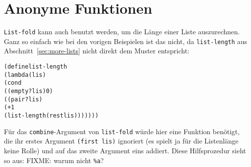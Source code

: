 \section{Anonyme Funktionen}\label{sec:anonymous-procedures}

\texttt{List-fold} kann auch benutzt werden, um die Länge einer Liste
auszurechnen.  Ganz so einfach wie bei den vorigen Beispielen ist das
nicht, da \texttt{list-length} aus
Abschnitt~\ref{sec:more-lists} nicht direkt dem Muster entspricht:
%
\begin{alltt}
(define list-length
  (lambda (lis)
    (cond
      ((empty? lis) 0)
      ((pair? lis) 
       (+ 1 
          (list-length (rest lis)))))))
\end{alltt}
%
Für das \texttt{combine}-Argument von \texttt{list-fold}
würde hier eine Funktion benötigt, die ihr erstes
Argument \texttt{(first lis)} ignoriert (es spielt ja für die Listenlänge
keine Rolle) und auf das zweite Argument eins addiert.  Diese
Hilfsprozedur sieht so aus:
%
FIXME: warum nicht \texttt{\%a}?

